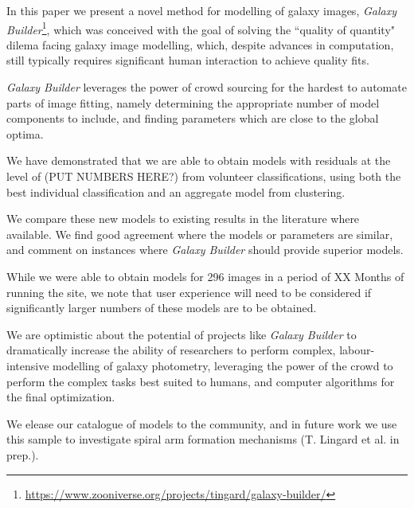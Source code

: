 \documentclass[../main.tex]{subfiles}
\begin{document}
\label{sec:conclusions}
In this paper we present a novel method for modelling of galaxy images, \textit{Galaxy Builder}\footnote{\url{https://www.zooniverse.org/projects/tingard/galaxy-builder/}}, which was conceived with the goal of solving the ``quality of quantity" dilema facing galaxy image modelling, which, despite advances in computation, still typically requires significant human interaction to achieve quality fits.

\textit{Galaxy Builder} leverages the power of crowd sourcing for the hardest to automate parts of image fitting, namely determining the appropriate number of model components to include, and finding parameters which are close to the global optima.

We have demonstrated that we are able to obtain models with residuals at the level of (PUT NUMBERS HERE?) from volunteer classifications, using both the best individual classification and an aggregate model from clustering.

We compare these new models to existing results in the literature where available. We find good agreement where the models or parameters are similar, and comment on instances where \textit{Galaxy Builder} should provide superior models.


While we were able to obtain models for 296 images in a period of XX Months of running the site, we note that user experience will need to be considered if significantly larger numbers of these models are to be obtained.

We are optimistic about the potential of projects like \textit{Galaxy Builder} to dramatically increase the ability of researchers to perform complex, labour-intensive modelling of galaxy photometry, leveraging the power of the crowd to perform the complex tasks best suited to humans, and computer algorithms for the final optimization.

We elease our catalogue of models to the community, and in future work we use this sample to investigate spiral arm formation mechanisms (T. Lingard et al. in prep.).
\end{document}
